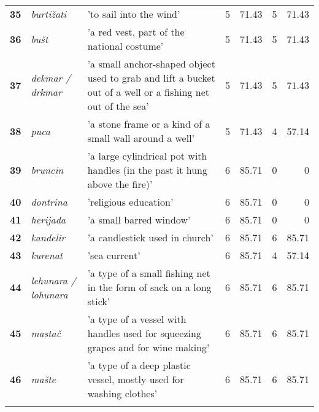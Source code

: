 \documentclass[output=paper]{LSP/langsci}
\begin{document}
\begin{table}
{\begin{tabular}{lp{}p{}lrlr}
{\bfseries 35} & {\itshape burtižati} & 'to sail into the wind' & 5 & 71.43 & 5 & 71.43\\

{\bfseries 36} & {\itshape bušt} & 'a red vest, part of the national costume' & 5 & 71.43 & 5 & 71.43\\

{\bfseries 37} & {\itshape dekmar / drkmar} & 'a small anchor-shaped object used to grab and lift a bucket out of a well or a fishing net out of the sea' & 5 & 71.43 & 5 & 71.43\\

{\bfseries 38} & {\itshape puca} & 'a stone frame or a kind of a small wall around a well' & 5 & 71.43 & 4 & 57.14\\

{\bfseries 39} & {\itshape bruncin} & 'a large cylindrical pot with handles (in the past it hung above the fire)' & 6 & 85.71 & 0 & 0\\

{\bfseries 40} & {\itshape dontrina} & 'religious education' & 6 & 85.71 & 0 & 0\\

{\bfseries 41} & {\itshape herijada} & 'a small barred window' & 6 & 85.71 & 0 & 0\\

{\bfseries 42} & {\itshape kandelir} & 'a candlestick used in church' & 6 & 85.71 & 6 & 85.71\\

{\bfseries 43} & {\itshape kurenat} & 'sea current' & 6 & 85.71 & 4 & 57.14\\

{\bfseries 44} & {\itshape lehunara / lohunara} & 'a type of a small fishing net in the form of sack on a long stick' & 6 & 85.71 & 6 & 85.71\\

{\bfseries 45} & {\itshape mastač} & 'a type of a vessel with handles used for squeezing grapes and for wine making' & 6 & 85.71 & 6 & 85.71\\

{\bfseries 46} & {\itshape mašte} & 'a type of a deep plastic vessel, mostly used for washing clothes' & 6 & 85.71 & 6 & 85.71\\

\lspbottomrule
\end{tabular}
}
\end{table}
\end{document}
